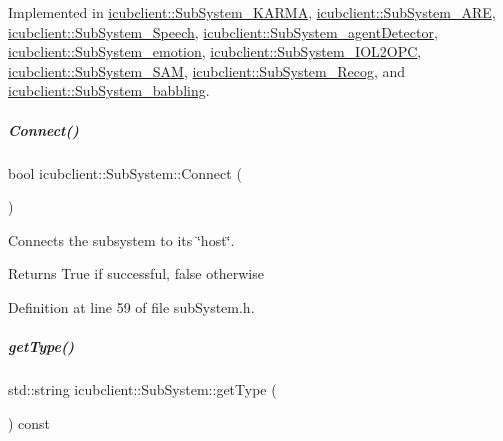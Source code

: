 Implemented in \hyperlink{group__icubclient__subsystems_acc63e171efddf99fa1e57ab1cdce3a13}{icubclient\+::\+Sub\+System\+\_\+\+K\+A\+R\+MA}, \hyperlink{group__icubclient__subsystems_ab11c67c801f58eca84e8ef2941d4f2a8}{icubclient\+::\+Sub\+System\+\_\+\+A\+RE}, \hyperlink{group__icubclient__subsystems_abbf3a0069184f64f4999b0e94077b2db}{icubclient\+::\+Sub\+System\+\_\+\+Speech}, \hyperlink{group__icubclient__subsystems_aca0db45f7e3522c954de25f61fd76f7f}{icubclient\+::\+Sub\+System\+\_\+agent\+Detector}, \hyperlink{group__icubclient__subsystems_af55715ece8170cb63fc2546f2bdcfcf1}{icubclient\+::\+Sub\+System\+\_\+emotion}, \hyperlink{group__icubclient__subsystems_a1407547931468f9d704e10e3436ed467}{icubclient\+::\+Sub\+System\+\_\+\+I\+O\+L2\+O\+PC}, \hyperlink{group__icubclient__subsystems_ac92b15f98651868bc31dbf4688d50e74}{icubclient\+::\+Sub\+System\+\_\+\+S\+AM}, \hyperlink{group__icubclient__subsystems_a98acf2fdda5a595803ce2e75e045a56f}{icubclient\+::\+Sub\+System\+\_\+\+Recog}, and \hyperlink{group__icubclient__subsystems_a571ba8f32c2ccf03610dd06866749d95}{icubclient\+::\+Sub\+System\+\_\+babbling}.

\mbox{\label{group__icubclient__subsystems_ab0a8208f6d5d178fc3e9931e122c1a87}} 
\subparagraph{\texorpdfstring{Connect()}{Connect()}}
{\footnotesize\ttfamily bool icubclient\+::\+Sub\+System\+::\+Connect (\begin{DoxyParamCaption}{ }\end{DoxyParamCaption})\hspace{0.3cm}{\ttfamily [inline]}}



Connects the subsystem to its \char`\"{}host\char`\"{}. 

\begin{DoxyReturn}{Returns}
True if successful, false otherwise 
\end{DoxyReturn}


Definition at line 59 of file sub\+System.\+h.

\mbox{\label{group__icubclient__subsystems_abdfadf6419f27b88ebc862d41568a896}} 
\subparagraph{\texorpdfstring{get\+Type()}{getType()}}
{\footnotesize\ttfamily std\+::string icubclient\+::\+Sub\+System\+::get\+Type (\begin{DoxyParamCaption}{ }\end{DoxyParamCaption}) const\hspace{0.3cm}{\ttfamily [inline]}}



